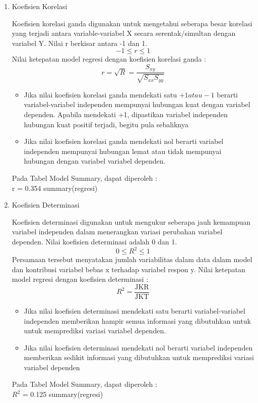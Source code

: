 \begin{enumerate}
\item Koefisien Korelasi \\
\begin{sloppypar}
Koefisien korelasi ganda digunakan untuk mengetahui seberapa besar korelasi yang terjadi antara variable-variabel X secara serentak/simultan dengan variabel Y. Nilai r berkisar antara -1 dan 1. $$-1 \leq r \leq 1$$ Nilai ketepatan model regresi dengan koefisien korelasi ganda : $$r = \sqrt{R} = \frac{S_{xy}}{\sqrt{S_{xx} S_{yy}}}$$
\end{sloppypar}
\begin{itemize}
    \item Jika nilai koefisien korelasi ganda mendekati satu \(+1 atau -1\) berarti variabel-variabel independen mempunyai hubungan kuat dengan variabel dependen. Apabila mendekati +1, dipastikan variabel independen hubungan kuat positif terjadi, begitu pula sebaliknya  
    \item Jika nilai koefisien korelasi ganda mendekati nol berarti variabel independen mempunyai hubungan lemat atau tidak mempunyai hubungan dengan variabel variabel dependen.    
\end{itemize}
\begin{test}{
    Pada Tabel Model Summary, dapat diperoleh : \\
    r = 0.354
}
summary(regresi)
\end{test}

\item Koefisien Determinasi \\
\begin{sloppypar}
Koefisien determinasi digunakan untuk mengukur seberapa jauh kemampuan variabel independen dalam menerangkan variasi perubahan variabel dependen. Nilai koefisien determinasi adalah 0 dan 1. $$0 \leq R^2 \leq 1$$ Persamaan tersebut menyatakan jumlah variabilitas dalam data dalam model dan kontribusi variabel bebas x terhadap variabel respon y. Nilai ketepatan model regresi dengan koefisien determinasi : $$R^2 = \frac{\text{JKR}}{\text{JKT}}$$
\end{sloppypar}
\begin{itemize}
    \item Jika nilai koefisien determinasi mendekati satu berarti variabel-variabel independen memberikan hampir semua informasi yang dibutuhkan untuk untuk memprediksi variasi variabel dependen.
    \item Jika nilai koefisien determinasi mendekati nol berarti variabel independen memberikan sedikit informasi yang dibutuhkan untuk memprediksi variasi variabel dependen
\end{itemize}
\begin{test}{
    Pada Tabel Model Summary, dapat diperoleh : \\
    $R^2$ = 0.125
}
summary(regresi)
\end{test}

\end{enumerate}
